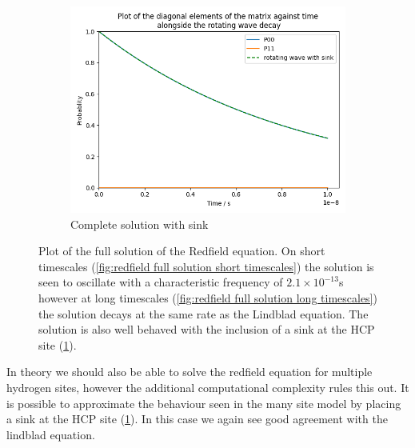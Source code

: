 \begin{figure}[htbp]
\begin{subfigure}{0.45\linewidth}
        \centering
        \includegraphics[width = 0.9\linewidth]{Figures/Redfield/Plot of redfield solution long time sink.png}
        \caption{Complete solution with sink
        }\label{fig:redfield full solution with sink}
    \end{subfigure}
    \caption{Plot of the full solution of the Redfield
    equation. On short timescales
    (\cref{fig:redfield full solution short timescales})
    the solution is seen to
    oscillate with a characteristic
    frequency of \(2.1\times{}10^{-13}\)s however
    at long timescales
    (\cref{fig:redfield full solution long timescales})
    the solution decays at the same rate as the
    Lindblad equation. The solution is
    also well behaved with the inclusion of
    a sink at the HCP site
    (\cref{fig:redfield full solution with sink}).
    }\label{fig:redfield full solution}
\end{figure}
In theory we should also be able
to solve the redfield equation
for multiple hydrogen sites, however
the additional computational complexity
rules this out. It is possible to
approximate the behaviour
seen in the many site model
by placing a sink at
the HCP site
(\cref{fig:redfield full solution with sink}).
In this case
we again see good
agreement with the
lindblad equation.